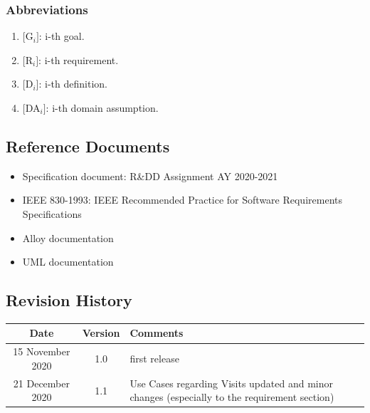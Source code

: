 \documentclass[a4paper, 12pt, oneside]{article}
\begin{document}
\subsubsection{Abbreviations}
\begin{enumerate}[label={AB.\arabic{*}}]
\item $[$G$_i]$: i-th goal.
\item $[$R$_i]$: i-th requirement.
\item $[$D$_i]$: i-th definition.
\item $[$DA$_i]$: i-th domain assumption.
\end{enumerate}

\subsection{Reference Documents}
\begin{itemize}
    \item Specification document: R\&DD Assignment AY 2020-2021
    \item IEEE 830-1993: IEEE Recommended Practice for Software Requirements Specifications
    \item Alloy documentation 
    \item UML documentation 
\end{itemize}

\subsection{Revision History}
\begin{center}
 \begin{tabular}{||c c p{50mm}|}
 \hline
 Date & Version & Comments \\ [0.5ex] 
 \hline\hline
 15 November 2020 & 1.0 & first release \\ 
 21 December 2020 & 1.1 & Use Cases regarding Visits updated and minor changes (especially to the requirement section) \\
 \hline
 \hline
\end{tabular}
\end{center}
\end{document}
